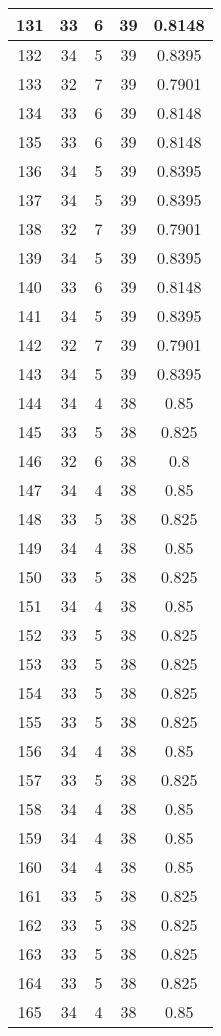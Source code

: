 \documentclass[letterpaper, 12pt]{article}
\begin{document}
\begin{longtable}{|c|c|c|c|c|}
\hline
131 & 33 & 6 & 39 & 0.8148 \\
\hline
132 & 34 & 5 & 39 & 0.8395 \\
\hline
133 & 32 & 7 & 39 & 0.7901 \\
\hline
134 & 33 & 6 & 39 & 0.8148 \\
\hline
135 & 33 & 6 & 39 & 0.8148 \\
\hline
136 & 34 & 5 & 39 & 0.8395 \\
\hline
137 & 34 & 5 & 39 & 0.8395 \\
\hline
138 & 32 & 7 & 39 & 0.7901 \\
\hline
139 & 34 & 5 & 39 & 0.8395 \\
\hline
140 & 33 & 6 & 39 & 0.8148 \\
\hline
141 & 34 & 5 & 39 & 0.8395 \\
\hline
142 & 32 & 7 & 39 & 0.7901 \\
\hline
143 & 34 & 5 & 39 & 0.8395 \\
\hline
144 & 34 & 4 & 38 & 0.85 \\
\hline
145 & 33 & 5 & 38 & 0.825 \\
\hline
146 & 32 & 6 & 38 & 0.8 \\
\hline
147 & 34 & 4 & 38 & 0.85 \\
\hline
148 & 33 & 5 & 38 & 0.825 \\
\hline
149 & 34 & 4 & 38 & 0.85 \\
\hline
150 & 33 & 5 & 38 & 0.825 \\
\hline
151 & 34 & 4 & 38 & 0.85 \\
\hline
152 & 33 & 5 & 38 & 0.825 \\
\hline
153 & 33 & 5 & 38 & 0.825 \\
\hline
154 & 33 & 5 & 38 & 0.825 \\
\hline
155 & 33 & 5 & 38 & 0.825 \\
\hline
156 & 34 & 4 & 38 & 0.85 \\
\hline
157 & 33 & 5 & 38 & 0.825 \\
\hline
158 & 34 & 4 & 38 & 0.85 \\
\hline
159 & 34 & 4 & 38 & 0.85 \\
\hline
160 & 34 & 4 & 38 & 0.85 \\
\hline
161 & 33 & 5 & 38 & 0.825 \\
\hline
162 & 33 & 5 & 38 & 0.825 \\
\hline
163 & 33 & 5 & 38 & 0.825 \\
\hline
164 & 33 & 5 & 38 & 0.825 \\
\hline
165 & 34 & 4 & 38 & 0.85 \\

\end{longtable}
\end{document}
